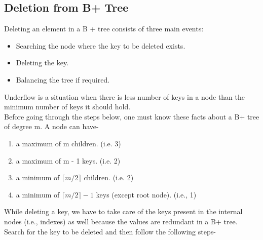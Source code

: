 \documentclass{article}
\begin{document}
    \subsection{Deletion from B+ Tree}
    Deleting an element in a B + tree consists of three main events: \begin{itemize}
        \item Searching the node where the key to be deleted exists.
        \item Deleting the key.
        \item Balancing the tree if required.
    \end{itemize}
   Underflow is a situation when there is less number of keys in a node than the minimum number of keys it should hold.\\
    Before going through the steps below, one must know these facts about a B+ tree of degree m. A node can have-
    \begin{enumerate}
        \item a maximum of m children. (i.e. 3)
        \item a maximum of m - 1 keys. (i.e. 2)
        \item a minimum of $\lceil m/2 \rceil$ children. (i.e. 2)
        \item a minimum of $\lceil m/2 \rceil - 1$ keys (except root node). (i.e., 1) \end{enumerate} 
    While deleting a key, we have to take care of the keys present in the internal nodes (i.e., indexes) as well because the values are redundant in a B+ tree. Search for the key to be deleted and then follow the following steps-
\end{document}
